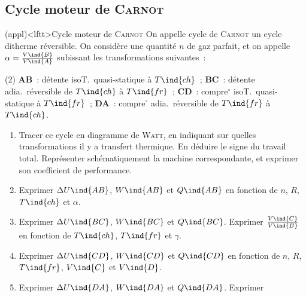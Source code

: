 \documentclass[../../main/main.tex]{subfiles}
\begin{document}
\subsection{Cycle moteur de \textsc{Carnot}}
\begin{tcb*}[breakable](appl)<lftt>{Cycle moteur de \textsc{Carnot}}
	On appelle cycle de \textsc{Carnot} un cycle ditherme réversible. On considère
	une quantité $n$ de gaz parfait, et on appelle $\alpha =
		\frac{V\ind{B}}{V\ind{A}}$ subissant les transformations suivantes~:
	\begin{tasks}[label=\bdmd](2)
		\task \textbf{AB}~: détente isoT.\ quasi-statique à $T\ind{ch}$~;
		\task \textbf{BC}~: détente adia.\ réversible de $T\ind{ch}$ à $T\ind{fr}$~;
		\task \textbf{CD}~: compre$^\circ$ isoT.\ quasi-statique à $T\ind{fr}$~;
		\task \textbf{DA}~: compre$^\circ$ adia.\ réversible de $T\ind{fr}$ à
		$T\ind{ch}$.
	\end{tasks}
	\begin{enumerate}[label=\sqenumi]
		\item Tracer ce cycle en diagramme de \textsc{Watt}, en indiquant sur
		      quelles transformations il y a transfert thermique. En déduire le signe du
		      travail total. Représenter schématiquement la machine correspondante, et
		      exprimer son coefficient de performance.
		\item Exprimer $\Delta{U}\ind{AB}$, $W\ind{AB}$ et $Q\ind{AB}$ en fonction
		      de $n$, $R$, $T\ind{ch}$ et $\alpha$.
		\item Exprimer $\Delta{U}\ind{BC}$, $W\ind{BC}$ et $Q\ind{BC}$. Exprimer
		      $\frac{V\ind{C}}{V\ind{B}}$ en fonction de $T\ind{ch}$, $T\ind{fr}$ et
		      $\gamma$.
		\item Exprimer $\Delta{U}\ind{CD}$, $W\ind{CD}$ et $Q\ind{CD}$ en fonction
		      de $n$, $R$, $T\ind{fr}$, $V\ind{C}$ et $V\ind{D}$.
		\item Exprimer $\Delta{U}\ind{DA}$, $W\ind{DA}$ et $Q\ind{DA}$. Exprimer

\end{enumerate}
\end{tcb*}
\end{document}
